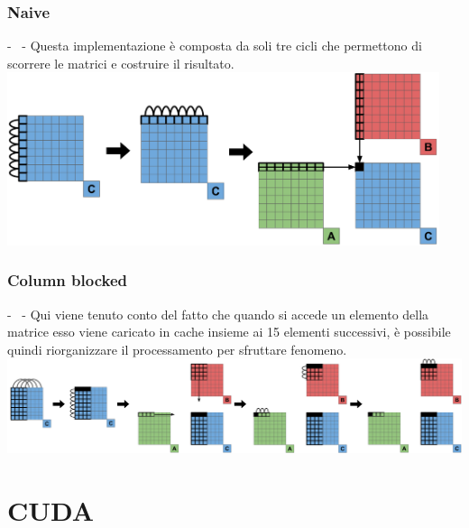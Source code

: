 \documentclass[compress]{beamer}
\begin{document}
\subsubsection*{Naive}
\begin{frame}{\secname \text{ }- \subsecname\ \text{ }- \subsubsecname}
    Questa implementazione è composta da soli tre cicli che permettono di scorrere le matrici e costruire il risultato.
    \begin{adjustbox}{margin=0cm 0cm 0cm 0.5cm, center} %
        \includegraphics[width=0.95\textwidth]{resources/naive_icon.png}
    \end{adjustbox}    
\end{frame}

\subsubsection*{Column blocked}
\begin{frame}{\secname \text{ }- \subsecname\ \text{ }- \subsubsecname}
    Qui viene tenuto conto del fatto che quando si accede un elemento della matrice esso viene caricato in cache insieme ai 15 elementi successivi, è possibile quindi riorganizzare il processamento per sfruttare fenomeno.
    \begin{adjustbox}{margin=0cm 0cm 0cm 0.7cm, center} %
        \includegraphics[width=1\textwidth]{resources/blocked_icon2.png}
    \end{adjustbox}
\end{frame}

\section{CUDA}
\end{document}
